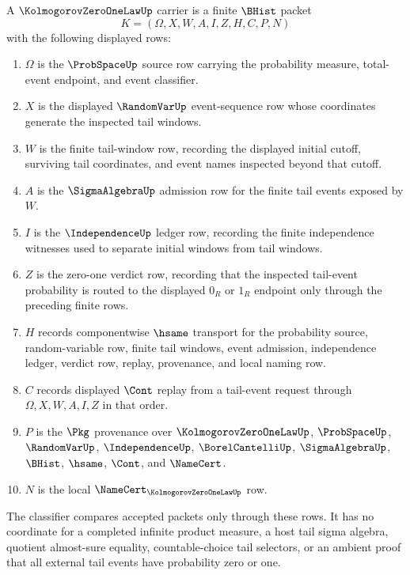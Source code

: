 \begin{definition}
\label{def:kolmogorov-zero-one-law-carrier}
A $\KolmogorovZeroOneLawUp$ carrier is a finite $\BHist$ packet
$$
K=(\Omega,X,W,A,I,Z,H,C,P,N)
$$
with the following displayed rows:
\begin{enumerate}
\item $\Omega$ is the $\ProbSpaceUp$ source row carrying the probability measure, total-event endpoint, and event classifier.
\item $X$ is the displayed $\RandomVarUp$ event-sequence row whose coordinates generate the inspected tail windows.
\item $W$ is the finite tail-window row, recording the displayed initial cutoff, surviving tail coordinates, and event names inspected beyond that cutoff.
\item $A$ is the $\SigmaAlgebraUp$ admission row for the finite tail events exposed by $W$.
\item $I$ is the $\IndependenceUp$ ledger row, recording the finite independence witnesses used to separate initial windows from tail windows.
\item $Z$ is the zero-one verdict row, recording that the inspected tail-event probability is routed to the displayed $0_R$ or $1_R$ endpoint only through the preceding finite rows.
\item $H$ records componentwise $\hsame$ transport for the probability source, random-variable row, finite tail windows, event admission, independence ledger, verdict row, replay, provenance, and local naming row.
\item $C$ records displayed $\Cont$ replay from a tail-event request through $\Omega,X,W,A,I,Z$ in that order.
\item $P$ is the $\Pkg$ provenance over $\KolmogorovZeroOneLawUp$, $\ProbSpaceUp$, $\RandomVarUp$, $\IndependenceUp$, $\BorelCantelliUp$, $\SigmaAlgebraUp$, $\BHist$, $\hsame$, $\Cont$, and $\NameCert$.
\item $N$ is the local $\NameCert_{\KolmogorovZeroOneLawUp}$ row.
\end{enumerate}
The classifier compares accepted packets only through these rows. It has no coordinate for a completed infinite product measure, a host tail sigma algebra, quotient almost-sure equality, countable-choice tail selectors, or an ambient proof that all external tail events have probability zero or one.
\end{definition}

